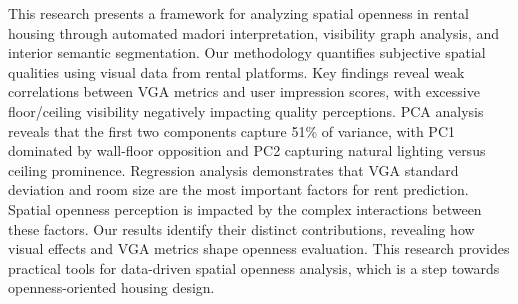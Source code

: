\documentclass[11pt,a4paper]{article}
\begin{document}
\begin{multicols}{2}
This research presents a framework for analyzing spatial openness in rental housing through automated madori
interpretation, visibility graph analysis, and interior semantic segmentation. Our methodology quantifies subjective 
spatial qualities using visual data from rental platforms. Key findings reveal weak correlations between VGA metrics 
and user impression scores, with excessive floor/ceiling visibility negatively impacting quality perceptions. 
PCA analysis reveals that the first two components capture 51\% of variance, with PC1 dominated by wall-floor 
opposition and PC2 capturing natural lighting versus ceiling prominence. Regression analysis demonstrates that VGA 
standard deviation and room size are the most important factors for rent prediction. Spatial openness perception is 
impacted by the complex interactions between these factors. Our results identify their distinct contributions, 
revealing how visual effects and VGA metrics shape openness evaluation. This research provides practical tools for 
data-driven spatial openness analysis, which is a step towards openness-oriented housing design.



\end{multicols}

\newpage

\begin{multicols}{2}
\fontsize{11}{11}\selectfont


\end{multicols}

\newpage

\begin{multicols}{2}
\fontsize{11}{13}\selectfont


\end{multicols}
\end{document}
